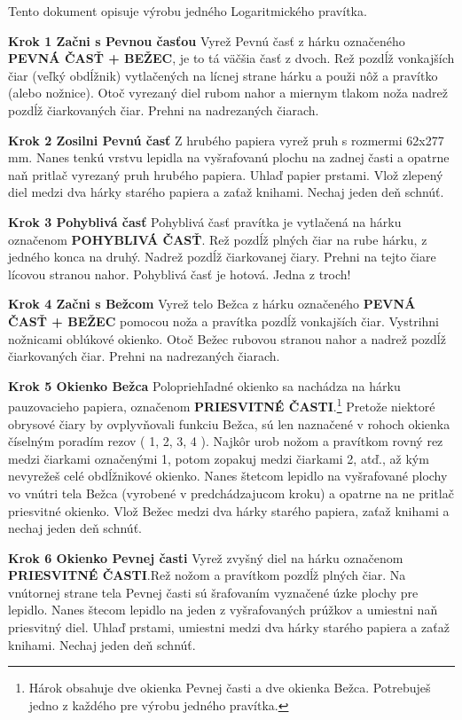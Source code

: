 \begin{multicols*}{3}
{  Tento dokument opisuje výrobu jedného Logaritmického pravítka.

  \textbf{Krok 1 Začni s Pevnou časťou} Vyrež Pevnú časť z hárku označeného \textbf{PEVNÁ ČASŤ + BEŽEC}, je to tá väčšia časť z dvoch. Rež pozdĺž vonkajších čiar (veľký obdĺžnik) vytlačených na lícnej strane hárku a použi nôž a pravítko (alebo nožnice). Otoč vyrezaný diel rubom nahor a miernym tlakom noža nadrež pozdĺž čiarkovaných čiar. Prehni na nadrezaných čiarach.

  \textbf{Krok 2 Zosilni Pevnú časť} Z hrubého papiera vyrež pruh s rozmermi 62x277 mm. Nanes tenkú vrstvu lepidla na vyšrafovanú plochu na zadnej časti a opatrne naň pritlač vyrezaný pruh hrubého papiera. Uhlaď papier prstami. Vlož zlepený diel medzi dva hárky starého papiera a zaťaž knihami. Nechaj jeden deň schnúť.

  \textbf{Krok 3 Pohyblivá časť} Pohyblivá časť pravítka je vytlačená na hárku označenom \textbf{POHYBLIVÁ ČASŤ}. Rež pozdĺž plných čiar na rube hárku, z jedného konca na druhý. Nadrež pozdĺž čiarkovanej čiary. Prehni na tejto čiare lícovou stranou nahor. Pohyblivá časť je hotová. Jedna z troch!

  \textbf{Krok 4 Začni s Bežcom} Vyrež telo Bežca z hárku označeného \textbf{PEVNÁ ČASŤ + BEŽEC} pomocou noža a pravítka pozdĺž vonkajších čiar. Vystrihni nožnicami oblúkové okienko. Otoč Bežec rubovou stranou nahor a nadrež pozdĺž čiarkovaných čiar. Prehni na nadrezaných čiarach.

  \textbf{Krok 5 Okienko Bežca} Polopriehľadné okienko sa nachádza na hárku pauzovacieho papiera, označenom \textbf{PRIESVITNÉ ČASTI}.\footnote{Hárok obsahuje dve okienka Pevnej časti a dve okienka Bežca. Potrebuješ jedno z každého pre výrobu jedného pravítka.} Pretože niektoré obrysové čiary by ovplyvňovali funkciu Bežca, sú len naznačené v rohoch okienka číselným poradím rezov ( 1, 2, 3, 4 ). Najkôr urob nožom a pravítkom rovný rez medzi čiarkami označenými 1, potom zopakuj medzi čiarkami 2, atď., až kým nevyrežeš celé obdĺžnikové okienko. Nanes štetcom lepidlo na vyšrafované plochy vo vnútri tela Bežca (vyrobené v predchádzajucom kroku) a opatrne na ne pritlač priesvitné okienko. Vlož Bežec medzi dva hárky starého papiera, zaťaž knihami a nechaj jeden deň schnúť.

  \textbf{Krok 6 Okienko Pevnej časti} Vyrež zvyšný diel na hárku označenom \textbf{PRIESVITNÉ ČASTI}.\footnotemark[\value{footnote}] Rež nožom a pravítkom pozdĺž plných čiar. Na vnútornej strane tela Pevnej časti sú šrafovaním vyznačené úzke plochy pre lepidlo. Nanes štecom lepidlo na jeden z vyšrafovaných prúžkov a umiestni naň priesvitný diel. Uhlaď prstami, umiestni medzi dva hárky starého papiera a zaťaž knihami. Nechaj jeden deň schnúť.

}
\end{multicols*}
